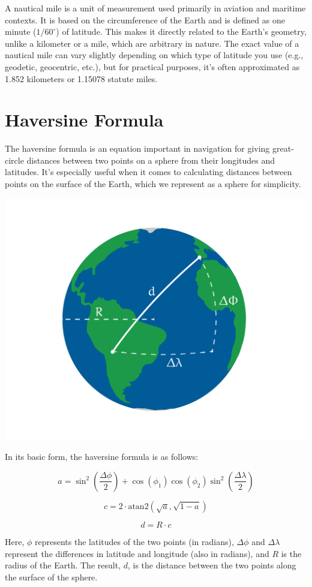 A nautical mile is a unit of measurement used primarily in aviation
and maritime contexts. It is based on the circumference of the Earth
and is defined as one minute ($1/60^{\circ}$) of latitude. This makes
it directly related to the Earth's geometry, unlike a kilometer or a
mile, which are arbitrary in nature. The exact value of a nautical
mile can vary slightly depending on which type of latitude you use
(e.g., geodetic, geocentric, etc.), but for practical purposes, it's
often approximated as 1.852 kilometers or 1.15078 statute miles.

\section{Haversine Formula}

The haversine formula is an equation important in navigation for
giving great-circle distances between two points on a sphere from
their longitudes and latitudes. It's especially useful when it comes
to calculating distances between points on the surface of the Earth,
which we represent as a sphere for simplicity.

  \includegraphics[width=\textwidth]{haversine.png}


In its basic form, the haversine formula is as follows:

\[
a = \sin^2\left(\frac{\Delta\phi}{2}\right) + \cos(\phi_1)\cos(\phi_2)\sin^2\left(\frac{\Delta\lambda}{2}\right)
\]

\[
c = 2 \cdot \text{atan2} \left( \sqrt{a}, \sqrt{1-a} \right)
\]

\[
d = R \cdot c
\]

Here, $\phi$ represents the latitudes of the two points (in radians),
$\Delta\phi$ and $\Delta\lambda$ represent the differences in latitude
and longitude (also in radians), and $R$ is the radius of the
Earth. The result, $d$, is the distance between the two points along
the surface of the sphere.
